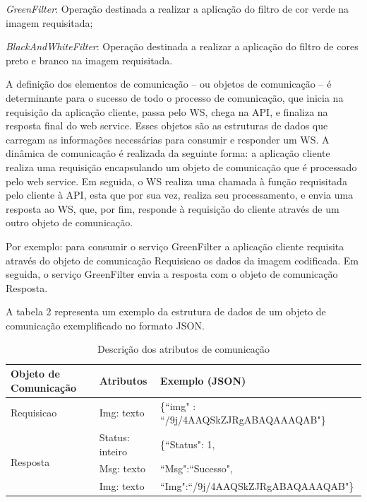 \documentclass[12pt]{article}
\begin{document}

\textit{GreenFilter}: Operação destinada a realizar a aplicação do filtro de cor verde na imagem requisitada;

\textit{BlackAndWhiteFilter}: Operação destinada a realizar a aplicação do filtro de cores preto e branco na imagem requisitada.

A definição dos elementos de comunicação – ou objetos de comunicação – é
determinante para o sucesso de todo o processo de comunicação, que inicia na requisição da aplicação cliente, passa pelo WS, chega na API, e finaliza na resposta final do web service. Esses objetos são as estruturas de dados que carregam as informações necessárias para consumir e responder um WS.
A dinâmica de comunicação é realizada da seguinte forma: a aplicação cliente realiza uma requisição encapsulando um objeto de comunicação que é processado pelo web service. Em seguida, o WS realiza uma chamada à função requisitada pelo cliente à API, esta que por sua vez, realiza seu processamento, e envia uma resposta ao WS, que, por fim, responde à requisição do cliente através de um outro objeto de comunicação.

Por exemplo: para consumir o serviço GreenFilter a aplicação cliente requisita através do objeto de comunicação Requisicao os dados da imagem codificada. Em seguida, o serviço GreenFilter envia a resposta com o objeto de comunicação Resposta.

A tabela 2 representa um exemplo da estrutura de dados de um objeto de
comunicação exemplificado no formato JSON.

\begin{table}[ht]
	\centering
	\caption{Descrição dos atributos de comunicação}
	\label{tab:Table2}
	\smallskip
	\begin{tabular}{ |l|l|l| }
		\hline
		Objeto de Comunicação & Atributos & Exemplo (JSON) \\ \hline
		Requisicao & Img: texto & \{“img" : “/9j/4AAQSkZJRgABAQAAAQAB"\} \\ \hline
		\multirow{3}{*}{Resposta} & Status: inteiro & \{“Status": 1, \\
		& Msg: texto & “Msg":“Sucesso", \\
		& Img: texto & “Img":“/9j/4AAQSkZJRgABAQAAAQAB"\} \\
		\hline
	\end{tabular}
\end{table}
\end{document}
